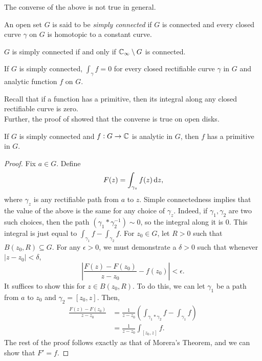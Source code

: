		The converse of the above is not true in general.

		\begin{fdef}
			An open set $G$ is said to be \emph{simply connected} if $G$ is connected and every closed curve $\gamma$ on $G$ is homotopic to a constant curve.
		\end{fdef}

		\begin{ftheo}
			$G$ is simply connected if and only if $\mathbb{C}_\infty \setminus G$ is connected.
		\end{ftheo}

		\begin{corollary}
			If $G$ is simply connected, $\int_\gamma f = 0$ for every closed rectifiable curve $\gamma$ in $G$ and analytic function $f$ on $G$.
		\end{corollary}

		Recall that if a function has a primitive, then its integral along any closed rectifiable curve is zero.\\
		Further, the proof of  showed that the converse is true on open disks.

		\begin{prop}
			If $G$ is simply connected and $f:G \to \mathbb{C}$ is analytic in $G$, then $f$ has a primitive in $G$.
		\end{prop}
		\begin{proof}
			Fix $a \in G$. Define
			\[ F(z) = \int_{\gamma_z} f(z) \dif z, \]
			where $\gamma_z$ is any rectifiable path from $a$ to $z$. Simple connectedness implies that the value of the above is the same for any choice of $\gamma_z$. Indeed, if $\gamma_1,\gamma_2$ are two such choices, then the path $(\gamma_1 * \gamma_2^{-1}) \sim 0$, so the integral along it is $0$. This integral is just equal to $\int_{\gamma_1} f - \int_{\gamma_2} f$. For $z_0 \in G$, let $R > 0$ such that $B(z_0,R) \subseteq G$. For any $\epsilon > 0$, we must demonstrate a $\delta > 0$ such that whenever $|z-z_0| < \delta$,
			\[ \left| \frac{F(z) - F(z_0)}{z-z_0} - f(z_0) \right| < \epsilon. \]
			It suffices to show this for $z \in B(z_0,R)$. To do this, we can let $\gamma_1$ be a path from $a$ to $z_0$ and $\gamma_2 = [z_0,z]$. Then,
			\begin{align*}
				\frac{F(z) - F(z_0)}{z-z_0} &= \frac{1}{z-z_0} \left( \int_{\gamma_1 * \gamma_2} f - \int_{\gamma_1} f \right) \\
					&= \frac{1}{z-z_0} \int_{[z_0,z]} f.
			\end{align*}
			The rest of the proof follows exactly as that of Morera's Theorem, and we can show that $F' = f$.
		\end{proof}

